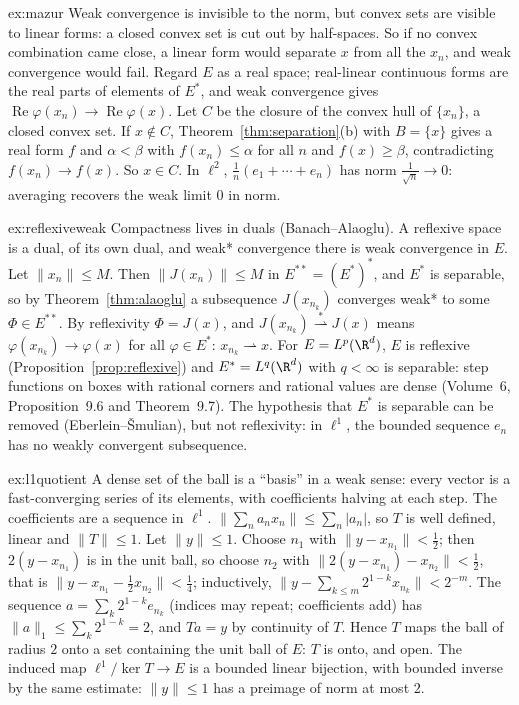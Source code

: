 \begin{solution}{ex:mazur}
\idea Weak convergence is invisible to the norm, but convex sets are visible to linear forms: a closed convex set is cut out by half-spaces. So if no convex combination came close, a linear form would separate $x$ from all
the $x_n$, and weak convergence would fail.
\writeup Regard $E$ as a real space; real-linear continuous forms are the real parts of elements of $E^*$, and weak convergence gives $\operatorname{Re}\varphi(x_n)\to\operatorname{Re}\varphi(x)$. Let $C$ be the closure of the convex hull
of $\{x_n\}$, a closed convex set. If $x\notin C$, Theorem~\ref{thm:separation}(b) with $B=\{x\}$ gives a real form $f$ and $\alpha<\beta$ with $f(x_n)\le\alpha$ for all $n$ and $f(x)\ge\beta$, contradicting $f(x_n)\to f(x)$. So $x\in C$.
In $\ell^2$, $\frac1n(e_1+\cdots+e_n)$ has norm $\frac1{\sqrt n}\to0$: averaging recovers the weak limit $0$ in norm.
\end{solution}

\begin{solution}{ex:reflexiveweak}
\idea Compactness lives in duals (Banach--Alaoglu). A reflexive space is a dual, of its own dual, and weak* convergence there is weak convergence in $E$.
\writeup Let $\|x_n\|\le M$. Then $\|J(x_n)\|\le M$ in $E^{**}=(E^*)^*$, and $E^*$ is separable, so by Theorem~\ref{thm:alaoglu} a subsequence $J(x_{n_k})$ converges weak* to some $\Phi\in E^{**}$. By reflexivity $\Phi=J(x)$, and
$J(x_{n_k})\overset*\rightharpoonup J(x)$ means $\varphi(x_{n_k})\to\varphi(x)$ for all $\varphi\in E^*$: $x_{n_k}\rightharpoonup x$. For $E=L^p(\R^d)$, $E$ is reflexive (Proposition~\ref{prop:reflexive}) and $E^*=L^q(\R^d)$ with $q<\infty$ is separable:
step functions on boxes with rational corners and rational values are dense (Volume~6, Proposition~9.6 and Theorem~9.7). The hypothesis that $E^*$ is separable can be removed (Eberlein--\v Smulian), but not reflexivity:
in $\ell^1$, the bounded sequence $e_n$ has no weakly convergent subsequence.
\end{solution}

\begin{solution}{ex:l1quotient}
\idea A dense set of the ball is a ``basis'' in a weak sense: every vector is a fast-converging series of its elements, with coefficients halving at each step. The coefficients are a sequence in $\ell^1$.
\writeup $\|\sum_na_nx_n\|\le\sum_n|a_n|$, so $T$ is well defined, linear and $\|T\|\le1$. Let $\|y\|\le1$. Choose $n_1$ with $\|y-x_{n_1}\|<\frac12$; then $2(y-x_{n_1})$ is in the unit ball, so choose $n_2$ with
$\|2(y-x_{n_1})-x_{n_2}\|<\frac12$, that is $\|y-x_{n_1}-\frac12x_{n_2}\|<\frac14$; inductively, $\|y-\sum_{k\le m}2^{1-k}x_{n_k}\|<2^{-m}$. The sequence $a=\sum_k2^{1-k}e_{n_k}$ (indices may repeat; coefficients add) has
$\|a\|_1\le\sum_k2^{1-k}=2$, and $Ta=y$ by continuity of $T$. Hence $T$ maps the ball of radius $2$ onto a set containing the unit ball of $E$: $T$ is onto, and open. The induced map $\ell^1/\ker T\to E$ is a bounded
linear bijection, with bounded inverse by the same estimate: $\|y\|\le1$ has a preimage of norm at most $2$.
\end{solution}

